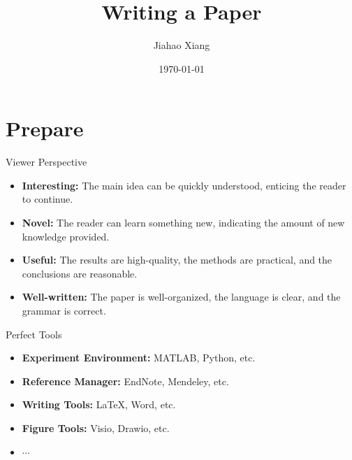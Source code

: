 \documentclass{beamer}
\title{Writing a Paper}
\author[xjh]{Jiahao Xiang\inst{1}}
\institute{
    \inst{1}
    Hengyang Normal University
}
\date{\today}
\begin{document}
\begin{frame}
    \titlepage
\end{frame}


\section{Prepare}
\begin{frame}{Viewer Perspective}
    \begin{itemize}
        \item \textbf{Interesting:} The main idea can be quickly understood, enticing the reader to continue.
        \item \textbf{Novel:} The reader can learn something new, indicating the amount of new knowledge provided.
        \item \textbf{Useful:} The results are high-quality, the methods are practical, and the conclusions are reasonable.
        \item \textbf{Well-written:} The paper is well-organized, the language is clear, and the grammar is correct.
    \end{itemize}
\end{frame}

\begin{frame}{Perfect Tools} %
    \begin{itemize} %
        \item \textbf{Experiment Environment:} MATLAB, Python, etc. %
        \item \textbf{Reference Manager:} EndNote, Mendeley, etc. %
        \item \textbf{Writing Tools:} \LaTeX, Word, etc. %
        \item \textbf{Figure Tools:} Visio, Drawio, etc. %
        \item $\cdots$ %
    \end{itemize} %
\end{frame} %
\end{document}
